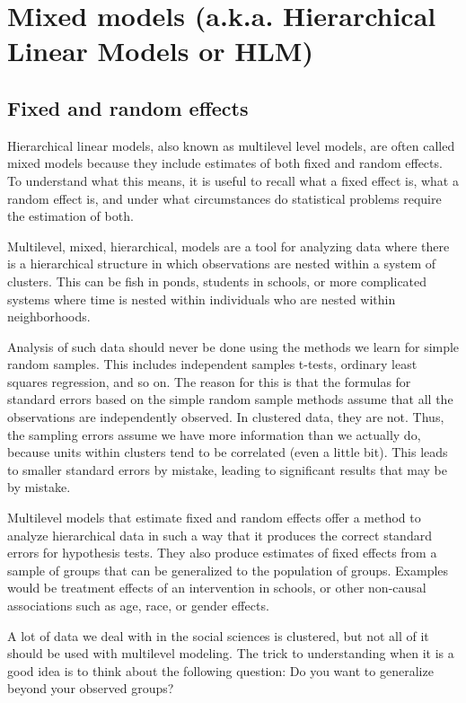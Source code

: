 \chapter{Mixed models (a.k.a. Hierarchical Linear Models or HLM)}

\section{Fixed and random effects}

Hierarchical linear models, also known as multilevel level models, are often called mixed models because they include estimates of both fixed and random effects. To understand what this means, it is useful to recall what a fixed effect is, what a random effect is, and under what circumstances do statistical problems require the estimation of both.

Multilevel, mixed, hierarchical, models are a tool for analyzing data where there is a hierarchical structure in which observations are nested within a system of clusters. This can be fish in ponds, students in schools, or more complicated systems where time is nested within individuals who are nested within neighborhoods.

Analysis of such data should never be done using the methods we learn for simple random samples. This includes independent samples t-tests, ordinary least squares regression, and so on. The reason for this is that the formulas for standard errors based on the simple random sample methods assume that all the observations are independently observed. In clustered data, they are not. Thus, the sampling errors assume we have more information than we actually do, because units within clusters tend to be correlated (even a little bit). This leads to smaller standard errors by mistake, leading to significant results that may be by mistake.

Multilevel models that estimate fixed and random effects offer a method to analyze hierarchical data in such a way that it produces the correct standard errors for hypothesis tests. They also produce estimates of fixed effects from a sample of groups that can be generalized to the population of groups. Examples would be treatment effects of an intervention in schools, or other non-causal associations such as age, race, or gender effects.

A lot of data we deal with in the social sciences is clustered, but not all of it should be used with multilevel modeling. The trick to understanding when it is a good idea is to think about the following question: Do you want to generalize beyond your observed groups?


